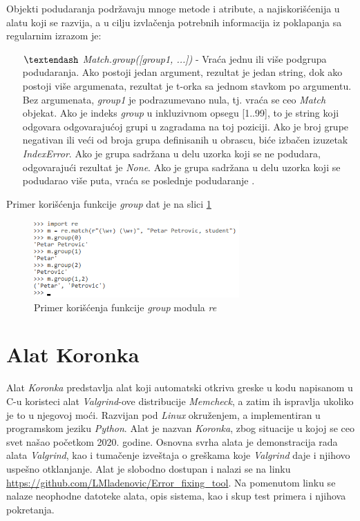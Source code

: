 \documentclass[12pt,oneside]{memoir}
\theoremstyle{plain}
\theoremstyle{definition}
\begin{document}
Objekti podudaranja podržavaju mnoge metode i atribute, a najiskorišćenija u alatu koji se razvija, a u cilju izvlačenja potrebnih informacija iz poklapanja sa regularnim izrazom je:
\begin{itemize}
\item[$\textendash$]  \textit{Match.group([group1, ...])} - Vraća jednu ili više podgrupa podudaranja. Ako postoji jedan argument, rezultat je jedan string, dok ako postoji više argumenata, rezultat je t-orka sa jednom stavkom po argumentu. Bez argumenata, \textit{group1} je  podrazumevano nula, tj. vraća se ceo \textit{Match} objekat. Ako je indeks \textit{group} u inkluzivnom opsegu [1..99], to je string koji odgovara odgovarajućoj grupi u zagradama na toj poziciji. Ako je broj grupe negativan ili veći od broja grupa definisanih u obrascu, biće izbačen izuzetak \textit{IndexError}. Ako je grupa sadržana u delu uzorka koji se ne podudara, odgovarajući rezultat je \textit{None}. Ako je grupa sadržana u delu uzorka koji se podudarao više puta, vraća se poslednje podudaranje \cite{reModule}.
\end{itemize}

Primer korišćenja funkcije \textit{group} dat je na slici \ref{fig:slika3.1}
\begin{figure}[!ht]
  \centering
  \includegraphics[width=0.7\textwidth]{reModule.png}
  \caption{Primer korišćenja funkcije \textit{group} modula \textit{re}}
  \label{fig:slika3.1}
\end{figure}


\chapter{Alat Koronka}
Alat \textit{Koronka} predstavlja alat koji automatski otkriva greske u kodu napisanom u C-u koristeci alat \textit{Valgrind}-ove distribucije \textit{Memcheck}, a zatim ih ispravlja ukoliko je to u njegovoj moći. Razvijan pod \textit{Linux} okruženjem, a implementiran u programskom jeziku \textit{Python}. Alat je nazvan \textit{Koronka}, zbog situacije u kojoj se ceo svet našao početkom 2020. godine. Osnovna svrha alata je demonstracija rada alata \textit{Valgrind}, kao i tumačenje izveštaja o greškama koje \textit{Valgrind} daje i njihovo uspešno otklanjanje. Alat je slobodno dostupan i nalazi se na linku \url{https://github.com/LMladenovic/Error_fixing_tool}. Na pomenutom linku se nalaze neophodne datoteke alata, opis sistema, kao i skup test primera i njihova pokretanja.
\end{document}
